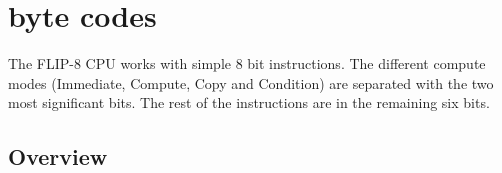 \section{byte codes}

The FLIP-8 CPU works with simple 8 bit instructions. The different compute modes (Immediate, Compute, Copy and Condition) are separated with the two most significant bits. The rest of the instructions are in the remaining six bits.

\subsection{Overview}

\begin{table}[ht]
    \center
    
\end{table}